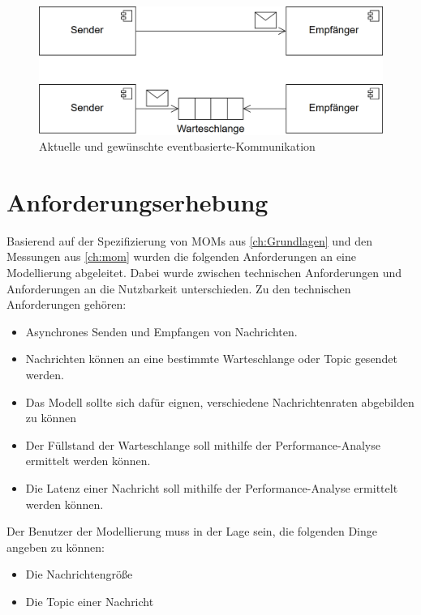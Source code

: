 \begin{figure}
\center
  \includegraphics[width=1\textwidth]{images/modelling/oldEventBased.png}
  \caption{Aktuelle und gewünschte eventbasierte-Kommunikation}
  \label{img:oldEventBased}
\end{figure}


\section{Anforderungserhebung}
\label{sec:anforderungserhebung}
Basierend auf der Spezifizierung von MOMs aus \autoref{ch:Grundlagen} und den Messungen aus \autoref{ch:mom} wurden die folgenden Anforderungen an eine Modellierung abgeleitet. Dabei wurde zwischen technischen Anforderungen und Anforderungen an die Nutzbarkeit unterschieden. 
Zu den technischen Anforderungen gehören:
\begin{itemize}
    \item Asynchrones Senden und Empfangen von Nachrichten.
    \item Nachrichten können an eine bestimmte Warteschlange oder Topic gesendet werden.
    \item Das Modell sollte sich dafür eignen, verschiedene Nachrichtenraten abgebilden zu können
    \item Der Füllstand der Warteschlange soll mithilfe der Performance-Analyse ermittelt werden können.
    \item Die Latenz einer Nachricht soll mithilfe der Performance-Analyse ermittelt werden können.
\end{itemize}
Der Benutzer der Modellierung muss in der Lage sein, die folgenden Dinge angeben zu können:
\begin{itemize}
    \item Die Nachrichtengröße
    \item Die Topic einer Nachricht
\end{itemize}


